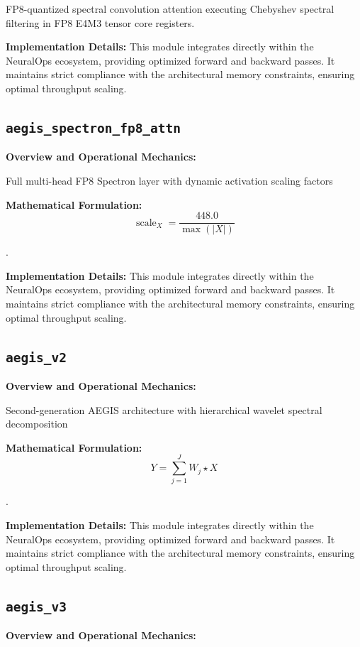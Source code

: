 \documentclass[10pt,twocolumn,letterpaper]{article}
\begin{document}
FP8-quantized spectral convolution attention executing Chebyshev spectral filtering in FP8 E4M3 tensor core registers.

\textbf{Implementation Details:}
This module integrates directly within the NeuralOps ecosystem, providing optimized forward and backward passes. It maintains strict compliance with the architectural memory constraints, ensuring optimal throughput scaling.

\subsection{\texttt{aegis\_spectron\_fp8\_attn}}
\textbf{Overview and Operational Mechanics:}

Full multi-head FP8 Spectron layer with dynamic activation scaling factors

\textbf{Mathematical Formulation:}
\begin{equation}
\operatorname{scale}_X = \frac{448.0}{\max(|X|)}
\end{equation}

.

\textbf{Implementation Details:}
This module integrates directly within the NeuralOps ecosystem, providing optimized forward and backward passes. It maintains strict compliance with the architectural memory constraints, ensuring optimal throughput scaling.

\subsection{\texttt{aegis\_v2}}
\textbf{Overview and Operational Mechanics:}

Second-generation AEGIS architecture with hierarchical wavelet spectral decomposition

\textbf{Mathematical Formulation:}
\begin{equation}
Y = \sum_{j=1}^J W_j \star X
\end{equation}

.

\textbf{Implementation Details:}
This module integrates directly within the NeuralOps ecosystem, providing optimized forward and backward passes. It maintains strict compliance with the architectural memory constraints, ensuring optimal throughput scaling.

\subsection{\texttt{aegis\_v3}}
\textbf{Overview and Operational Mechanics:}
\end{document}
